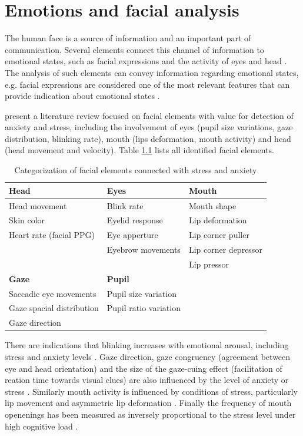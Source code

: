 \chapter{Emotions and facial analysis}
\label{ch:literature-face}

The human face is a source of information and an important part of communication. Several elements connect this channel of information to emotional states, such as facial expressions and the activity of eyes and head \parencite{akakin2010spatiotemporal}. The analysis of such elements can convey information regarding emotional states, e.g. facial expressions are considered one of the most relevant features that can provide indication about emotional states \parencite{cowie2001emotion}.

\textcite{giannakakis2017stress} present a literature review focused on facial elements with value for detection of anxiety and stress, including the involvement of eyes (pupil size variations, gaze distribution, blinking rate), mouth (lips deformation, mouth activity) and head (head movement and velocity). Table \ref{table:stress-facial-features} lists all identified facial elements.

\begin{table}[h]
\caption{Categorization of facial elements connected with stress and anxiety \parencite{giannakakis2017stress}}
\label{table:stress-facial-features}
\begin{tabular}{lll}%
\toprule%
\textbf{Head} & \textbf{Eyes} & \textbf{Mouth} \\
\midrule
Head movement & Blink rate & Mouth shape \\
Skin color & Eyelid response & Lip deformation  \\
Heart rate (facial PPG) & Eye apperture & Lip corner puller \\
& Eyebrow movements & Lip corner depressor \\
& & Lip pressor \\
\midrule
\textbf{Gaze} & \textbf{Pupil} & \\
\midrule
Saccadic eye movements & Pupil size variation &  \\
Gaze spacial distribution & Pupil ratio variation &  \\
Gaze direction & &\\
\bottomrule%
\end{tabular}%
\end{table}

There are indications that blinking increases with emotional arousal, including stress and anxiety levels \parencite{dinges2005optical}. Gaze direction, gaze congruency (agreement between eye and head orientation) and the size of the gaze-cuing effect (facilitation of reation time towards visual clues) are also influenced by the level of anxiety or stress \parencite{staab2014influence}. Similarly mouth activity is influenced by conditions of stress, particularly lip movement \parencite{dinges2005optical} and asymmetric lip deformation \parencite{metaxas2004image}. Finally the frequency of mouth openenings has been measured as inversely proportional to the stress level under high cognitive load \parencite{liao2005decision}.

